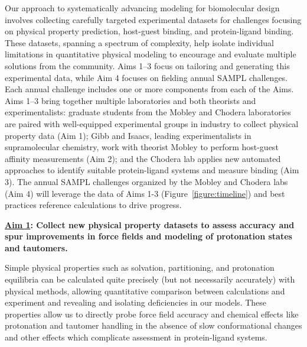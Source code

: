 \documentclass[11pt]{article}
\begin{document}
Our approach to systematically advancing modeling for biomolecular design involves collecting carefully targeted experimental datasets for challenges focusing on physical property prediction, host-guest binding, and protein-ligand binding.
These datasets, spanning a spectrum of complexity, help isolate individual limitations in quantitative physical modeling to encourage and evaluate multiple solutions from the community.
Aims 1--3 focus on tailoring and generating this experimental data, while Aim 4 focuses on fielding annual SAMPL challenges. 
Each annual challenge includes one or more components from each of the Aims.
Aims 1--3 bring together multiple laboratories and both theorists and experimentalists: graduate students from the Mobley and Chodera laboratories are paired with well-equipped experimental groups in industry to collect physical property data (Aim 1); Gibb and Isaacs, leading experimentalists in supramolecular chemistry, work with theorist Mobley to perform host-guest affinity measurements (Aim 2); and the Chodera lab applies new automated approaches to identify suitable protein-ligand systems and measure binding (Aim 3).
The annual SAMPL challenges organized by the Mobley and Chodera labs (Aim 4) will leverage the data of Aims 1-3 (Figure~\ref{figure:timeline}) and best practices reference calculations to drive progress.

\textbf{\underline{Aim 1}: Collect new physical property datasets to assess accuracy and spur improvements in force fields and modeling of protonation states and tautomers.} 


Simple physical properties such as solvation, partitioning, and protonation equilibria can be calculated quite precisely (but not necessarily accurately) with physical methods, allowing quantitative comparison between calculations and experiment and revealing and isolating deficiencies in our models. 
These properties allow us to directly probe force field accuracy and chemical effects like protonation and tautomer handling in the absence of slow conformational changes and other effects which complicate assessment in protein-ligand systems. 
\end{document}

